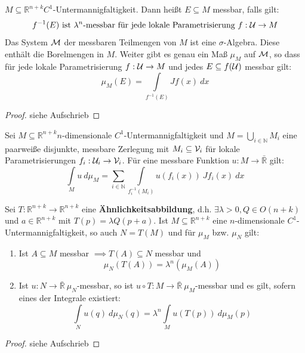   \begin{theorem}[Flächenmaß]
    $M \subseteq \mathbb{R}^{n+k} C^1$-Untermannigfaltigkeit. Dann heißt $E \subseteq M$ messbar, falls gilt:
    $$f^{-1}(E) \text{ ist } \lambda^n\text{-messbar für jede lokale Parametrisierung } f: \mathcal{U} \to M$$
    Das System $\mathcal{M}$ der messbaren Teilmengen von $M$ ist eine $\sigma$-Algebra. Diese enthält die Borelmengen in $M$. Weiter gibt es genau ein Maß $\mu_M$ auf $\mathcal{M}$, so dass für jede lokale Parametrisierung $f: \mathcal{U} \to M$ und jedes $E \subseteq f(\mathcal{U})$ messbar gilt:
    $$\mu_M(E) = \int\limits_{f^{-1}(E)}Jf(x) \ dx$$
  \end{theorem}
  \begin{proof}
    siehe Aufschrieb
  \end{proof}

  \newpage
  \begin{theorem}[Oberflächenintegral]
    Sei $M \subseteq \mathbb{R}^{n+k} n$-dimensionale $C^1$-Untermannigfaltigkeit und $M = \bigcup\limits_{i \in \mathbb{N}} M_i$ eine paarweiße disjunkte, messbare Zerlegung mit $M_i \subseteq \mathcal{V}_i$ für lokale Parametrisierungen $f_i: \mathcal{U}_i \to \mathcal{V}_i$. Für eine messbare Funktion $u: M \to \bar{\mathbb{R}}$ gilt:
    $$\int\limits_M u \ d\mu_M = \sum\limits_{i \in \mathbb{N}} \int\limits_{f_i^{-1}(M_i)} u(f_i(x))\ Jf_i(x)\ dx$$
  \end{theorem}

  \begin{lemma}
    Sei $T:\mathbb{R}^{n+k} \to \mathbb{R}^{n+k}$ eine \textbf{Ähnlichkeitsabbildung}, d.h. $\exists \lambda>0, Q\in O(n+k)$ und $a\in\mathbb{R}^{n+k}$ mit $T(p) = \lambda Q(p+a)$. Ist $M \subseteq \mathbb{R}^{n+k}$ eine $n$-dimensionale $C^1$-Untermannigfaltigkeit, so auch $N = T(M)$ und für $\mu_M$ bzw. $\mu_N$ gilt:
    \begin{enumerate}
      \item Ist $A \subseteq M$ messbar $\implies T(A) \subseteq N$ messbar und 
        $$\mu_N(T(A)) = \lambda^n (\mu_M(A))$$
      \item Ist $u: N \to \bar{\mathbb{R}} \ \mu_N$-messbar, so ist $u \circ T: M \to \bar{\mathbb{R}} \ \mu_M$-messbar und es gilt, sofern eines der Integrale existiert:
        $$\int\limits_N u(q) \ d\mu_N(q) = \lambda^n \int\limits_M u(T(p)) \ d\mu_M(p)$$
    \end{enumerate}
  \end{lemma}
  \begin{proof}
    siehe Aufschrieb
  \end{proof}

